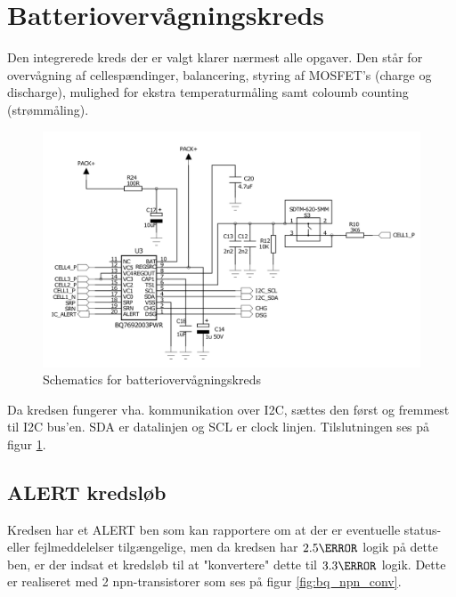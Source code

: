 \section{Batteriovervågningskreds}\label{afs:bms_ic_desc}
Den integrerede kreds der er valgt klarer nærmest alle opgaver. Den står for overvågning af cellespændinger, balancering, styring af MOSFET's (charge og discharge), mulighed for ekstra temperaturmåling samt coloumb counting (strømmåling). \\

\begin{figure}[h]
	\centering
	\includegraphics[width=15cm]{billeder/bms_ic_sch.png}
	\caption{Schematics for batteriovervågningskreds}
	\label{fig:temp_sensor}
\end{figure}

Da kredsen fungerer vha. kommunikation over I2C, sættes den først og fremmest til I2C bus'en. SDA er datalinjen og SCL er clock linjen. Tilslutningen ses på figur \ref{fig:temp_sensor}.

\subsection{ALERT kredsløb}
Kredsen har et ALERT ben som kan rapportere om at der er eventuelle status- eller fejlmeddelelser tilgængelige, men da kredsen har $2.5\volt$ logik på dette ben, er der indsat et kredsløb til at "konvertere" \space dette til $3.3\volt$ logik. Dette er realiseret med 2 npn-transistorer som ses på figur \ref{fig:bq_npn_conv}.

